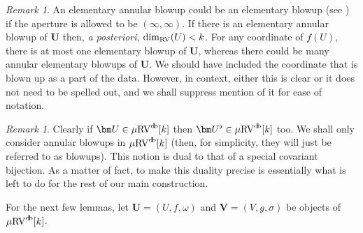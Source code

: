 \documentclass[12pt]{amsart}
\theoremstyle{plain}
\theoremstyle{definition}
\theoremstyle{remark}
\newtheorem{rem}[thm]{Remark}
\numberwithin{equation}{section}
\theoremstyle{plain}
\newcommand{\RV}{\textup{RV}}
\newcommand{\0}{\emptyset}
\newcommand{\mRV}{{\mu}{\RV}}
\DeclareMathOperator{\db}{d \! b}
\begin{document}
\begin{rem}
An elementary annular blowup could be an elementary blowup (see \cite[Definition~6.1]{Yin:int:acvf}) if the aperture is allowed to be $(\infty, \infty)$. If there is an elementary annular blowup of $\bm U$ then, \textit{a posteriori}, $\dim_{\RV}(U) < k$. For any coordinate of $f(U)$, there is at most one elementary blowup of $\bm U$, whereas there could be many annular elementary blowups of $\bm U$. We should have included the coordinate that is blown up as a part of the data. However, in context, either this is
clear or it does not need to be spelled out, and we shall suppress mention of it for ease of notation.
\end{rem}

\begin{rem}
Clearly if $\bm U \in \mRV^{\db}[k]$  then $\bm U^{\flat} \in \mRV^{\db}[k]$ too. We shall only consider annular blowups  in $\mRV^{\db}[k]$ (then, for simplicity, they will just be referred to as blowups). This notion is dual to that of a  special covariant bijection. As a matter of fact, to make this duality precise is essentially what is left to do for the rest of our main construction.
\end{rem}



For the next few lemmas, let $\bm U = (U, f, \omega)$ and $\bm V = (V, g, \sigma)$ be objects of $\mRV^{\db}[k]$.

\end{document}
